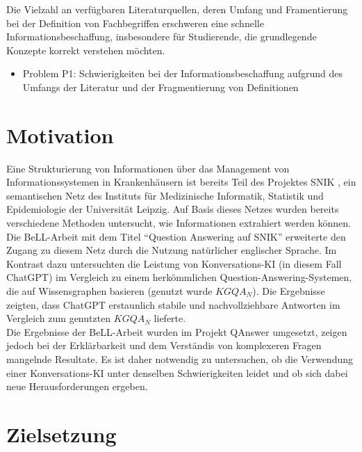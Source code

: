 Die Vielzahl an verfügbaren Literaturquellen, deren Umfang und Framentierung bei der Definition von Fachbegriffen
erschweren eine schnelle Informationsbeschaffung, insbesondere für Studierende, die grundlegende Konzepte korrekt verstehen möchten. \\

\begin{itemize}
  \item Problem P1: Schwierigkeiten bei der Informationsbeschaffung aufgrund des Umfangs der Literatur und der Fragmentierung von Definitionen
\end{itemize}

\section{Motivation}

Eine Strukturierung von Informationen über das Management von Informationssystemen in Krankenhäusern ist bereits Teil des Projektes SNIK \citep{semantischesnetz}, 
ein semantischen Netz des Instituts für Medizinische Informatik, Statistik und Epidemiologie der Universität Leipzig.
Auf Basis dieses Netzes wurden bereits verschiedene Methoden untersucht, wie Informationen extrahiert werden können.\\

Die BeLL-Arbeit mit dem Titel \enquote{Question Answering auf SNIK} \citep{hannesbell} erweiterte den Zugang zu diesem Netz durch die Nutzung natürlicher englischer Sprache. 
Im Kontrast dazu untersuchten \citet{chatgpt_qas} die Leistung von Konversations-KI (in diesem Fall ChatGPT) im Vergleich zu einem herkömmlichen Question-Answering-Systemen, die auf Wissensgraphen basieren (genutzt wurde $KGQA_N$).
Die Ergebnisse zeigten, dass ChatGPT erstaunlich stabile und nachvollziehbare Antworten im Vergleich zum genutzten $KGQA_N$ lieferte.\\

Die Ergebnisse der BeLL-Arbeit wurden im Projekt QAnswer \citep{qanswer} umgesetzt, zeigen jedoch bei der Erklärbarkeit und dem Verständis von komplexeren Fragen mangelnde Resultate. 
Es ist daher notwendig zu untersuchen, ob die Verwendung einer Konversations-KI unter denselben Schwierigkeiten leidet und ob sich dabei neue Herausforderungen ergeben.

\section{Zielsetzung}\label{sec:zielsetzung}

